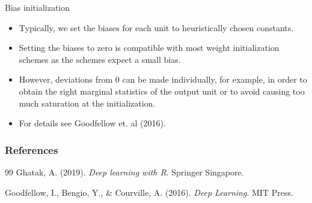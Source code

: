 \begin{vbframe}{Bias initialization}
  \begin{itemize}
    \item Typically, we set the biases for each unit to heuristically chosen constants. 
    \item Setting the biases to zero is compatible with most weight
initialization schemes as the schemes expect a small bias. 
    \item However, deviations from 0 can be made individually, for example, in order to obtain the right marginal statistics of the output unit or to avoid causing too much saturation at the initialization.
    \item For details see Goodfellow et. al (2016).
  \end{itemize}
\end{vbframe}



\begin{vbframe}
\frametitle{References}
\footnotesize{
\begin{thebibliography}{99}
 Ghatak, A. (2019). \textit{Deep learning with R}. Springer Singapore. 

Goodfellow, I., Bengio, Y., \& Courville, A. (2016). \textit{Deep Learning}. MIT Press.
\end{thebibliography}
}
\end{vbframe}




